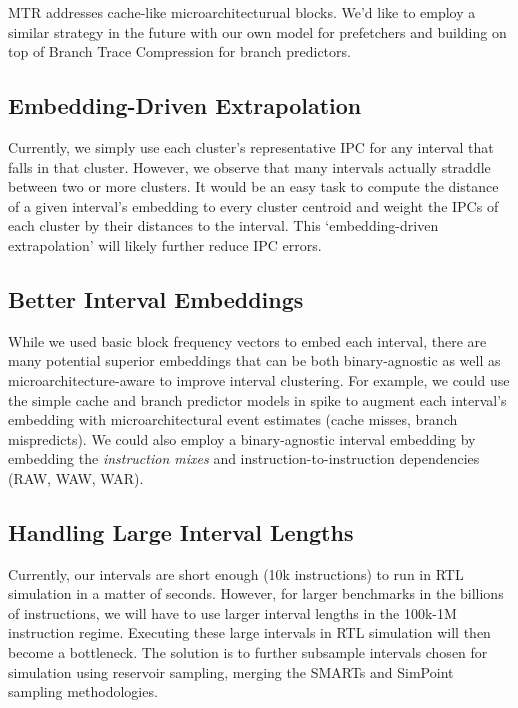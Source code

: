 \documentclass[sigplan,nonacm,10pt]{acmart}
\begin{document}
MTR addresses cache-like microarchitecturual blocks. We'd like to employ a similar strategy in the future with our own model for prefetchers and building on top of Branch Trace Compression \cite{barr2006branch} for branch predictors. 

\subsection{Embedding-Driven Extrapolation}

Currently, we simply use each cluster's representative IPC for any interval that falls in that cluster.
However, we observe that many intervals actually straddle between two or more clusters.
It would be an easy task to compute the distance of a given interval's embedding to every cluster centroid and weight the IPCs of each cluster by their distances to the interval.
This `embedding-driven extrapolation' will likely further reduce IPC errors.

\subsection{Better Interval Embeddings}

While we used basic block frequency vectors to embed each interval, there are many potential superior embeddings that can be both binary-agnostic as well as microarchitecture-aware to improve interval clustering.
For example, we could use the simple cache and branch predictor models in spike to augment each interval's embedding with microarchitectural event estimates (cache misses, branch mispredicts).
We could also employ a binary-agnostic interval embedding by embedding the \textit{instruction mixes} and instruction-to-instruction dependencies (RAW, WAW, WAR).

\subsection{Handling Large Interval Lengths}

Currently, our intervals are short enough (10k instructions) to run in RTL simulation in a matter of seconds.
However, for larger benchmarks in the billions of instructions, we will have to use larger interval lengths in the 100k-1M instruction regime.
Executing these large intervals in RTL simulation will then become a bottleneck.
The solution is to further subsample intervals chosen for simulation using reservoir sampling, merging the SMARTs and SimPoint sampling methodologies.
\end{document}
